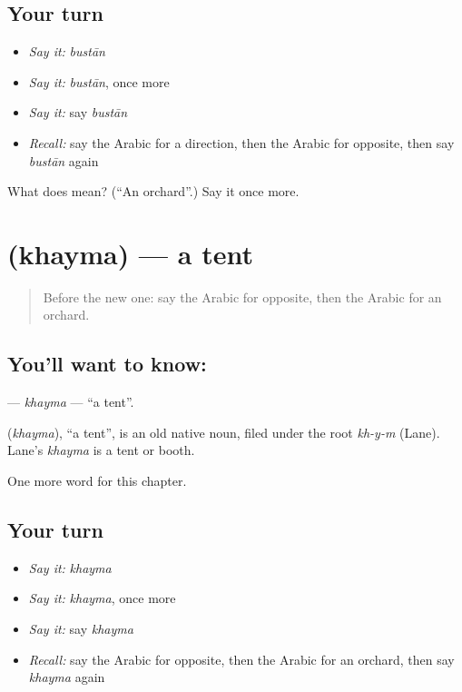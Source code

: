 \subsection*{Your turn}
\begin{itemize}
\raggedright
  \item \emph{Say it:} \emph{bustān}
  \item \emph{Say it:} \emph{bustān}, once more
  \item \emph{Say it:} say \emph{bustān}
  \item \emph{Recall:} say the Arabic for a direction, then the Arabic for opposite, then say \emph{bustān} again
\end{itemize}

\begin{tcolorbox}[breakable,colback=teal!4,colframe=teal!35!black,title={Before you move on}]
What does  mean? (\textquotedblleft{}An orchard\textquotedblright{}.) Say it once more.
\end{tcolorbox}
\section[\texorpdfstring{\ar{خيمة} (khayma)}{خيمة (khayma)}]{ (khayma) — a tent}

\label{lesson:AR-C173-khayma}



\begin{quote}
Before the new one: say the Arabic for opposite, then the Arabic for an orchard.
\end{quote}

\subsection*{You'll want to know: }
\textbf{} — \emph{khayma} — \textquotedblleft{}a tent\textquotedblright{}.

\begin{cousinweb}
\textbf{} (\emph{khayma}), \textquotedblleft{}a tent\textquotedblright{}, is an old native noun, filed under the root \emph{kh-y-m} (Lane). Lane's \emph{khayma} is a tent or booth.
\end{cousinweb}

\begin{grammarlens}[title={What you've built}]
One more word for this chapter.
\end{grammarlens}

\subsection*{Your turn}
\begin{itemize}
\raggedright
  \item \emph{Say it:} \emph{khayma}
  \item \emph{Say it:} \emph{khayma}, once more
  \item \emph{Say it:} say \emph{khayma}
  \item \emph{Recall:} say the Arabic for opposite, then the Arabic for an orchard, then say \emph{khayma} again
\end{itemize}

